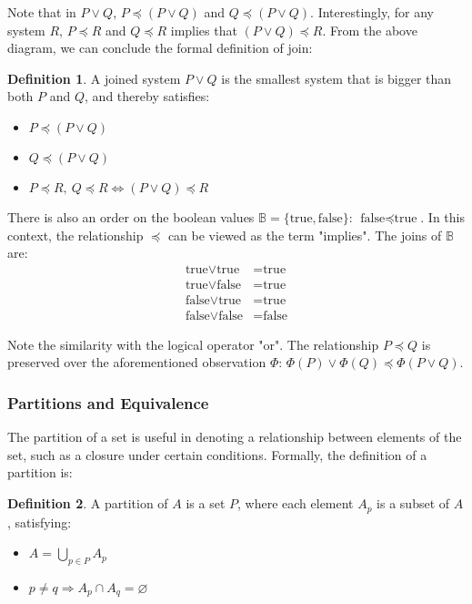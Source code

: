 \documentclass[12pt]{article}
\theoremstyle{definition}
\newtheorem{defn}{Definition}[section]
\newcommand{\T}{\text{true}}
\newcommand{\F}{\text{false}}
\begin{document}
	Note that in $P \lor Q$, $P \preceq (P \lor Q)$ and $Q \preceq (P \lor Q)$. Interestingly, for any system $R$, $P \preceq R$ and $Q \preceq R$ implies that $(P \lor Q) \preceq R$. From the above diagram, we can conclude the formal definition of join:
	\begin{defn}
		A joined system $P \lor Q$ is the smallest system that is bigger than both $P$ and $Q$, and thereby satisfies:
		\begin{itemize}
			\item $P \preceq (P \lor Q)$
			\item $Q \preceq (P \lor Q)$
			\item $P \preceq R,\ Q \preceq R \iff (P \lor Q) \preceq R$
		\end{itemize}
	\end{defn}
	
	There is also an order on the boolean values $\mathbb{B} = \{\T, \F\}$: $\F \preceq \T$. In this context, the relationship $\preceq$ can be viewed as the term "implies". The joins of $\mathbb{B}$ are:
	\begin{align*}
		\T \lor \T &= \T \\
		\T \lor \F &= \T \\
		\F \lor \T &= \T \\
		\F \lor \F &= \F
	\end{align*}
	
	Note the similarity with the logical operator "or".
	The relationship $P \preceq Q$ is preserved over the aforementioned observation $\Phi$: $\Phi(P) \lor \Phi(Q) \preceq \Phi(P \lor Q)$.
	
	\subsubsection{Partitions and Equivalence}
	
	The partition of a set is useful in denoting a relationship between elements of the set, such as a closure under certain conditions. Formally, the definition of a partition is:
	\begin{defn}
		A partition of $A$ is a set $P$, where each element $A_p$ is a subset of $A$, satisfying:
		\begin{itemize}
			\item $A = \bigcup_{p \in P} A_p$
			\item $p \neq q \Rightarrow A_p \cap A_q = \varnothing$
		\end{itemize}
	\end{defn}
	
	
	
\end{document}
